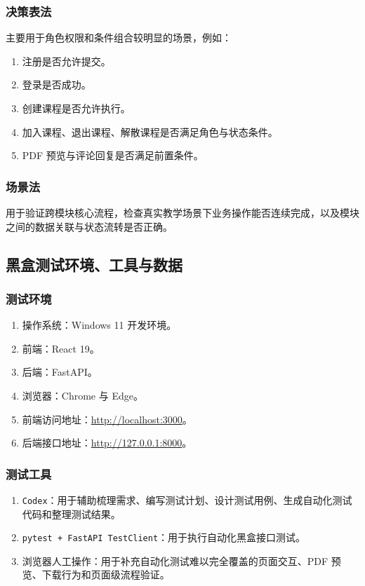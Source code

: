 \documentclass[12pt,a4paper]{ctexart}
\begin{document}
\subsubsection{决策表法}

主要用于角色权限和条件组合较明显的场景，例如：

\begin{enumerate}
  \item 注册是否允许提交。
  \item 登录是否成功。
  \item 创建课程是否允许执行。
  \item 加入课程、退出课程、解散课程是否满足角色与状态条件。
  \item PDF 预览与评论回复是否满足前置条件。
\end{enumerate}

\subsubsection{场景法}

用于验证跨模块核心流程，检查真实教学场景下业务操作能否连续完成，以及模块之间的数据关联与状态流转是否正确。

\subsection{黑盒测试环境、工具与数据}

\subsubsection{测试环境}

\begin{enumerate}
  \item 操作系统：Windows 11 开发环境。
  \item 前端：React 19。
  \item 后端：FastAPI。
  \item 浏览器：Chrome 与 Edge。
  \item 前端访问地址：\url{http://localhost:3000}。
  \item 后端接口地址：\url{http://127.0.0.1:8000}。
\end{enumerate}

\subsubsection{测试工具}

\begin{enumerate}
  \item \texttt{Codex}：用于辅助梳理需求、编写测试计划、设计测试用例、生成自动化测试代码和整理测试结果。
  \item \texttt{pytest + FastAPI TestClient}：用于执行自动化黑盒接口测试。
  \item 浏览器人工操作：用于补充自动化测试难以完全覆盖的页面交互、PDF 预览、下载行为和页面级流程验证。
\end{enumerate}
\end{document}

